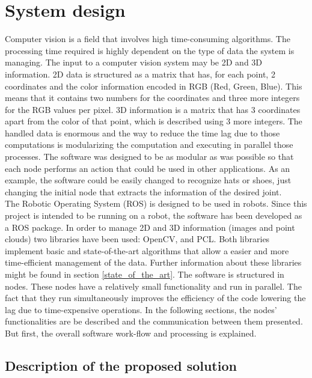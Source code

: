 \newpage
\section{System design}
\label{system_design}
Computer vision is a field that involves high time-consuming algorithms. 
The processing time required is highly dependent on the type of data the system is managing. 
The input to a computer vision system may be 2D and 3D information. 
2D data is structured as a matrix that has, for each point, 2 coordinates and the color information encoded in RGB (Red, Green, Blue).
This means that it contains two numbers for the coordinates and three more integers for the RGB values per pixel. 
3D information is a matrix that has 3 coordinates apart from the color of that point, which is described using 3 more integers. 
The handled data is enormous and the way to reduce the time lag due to those computations is modularizing the computation and executing in parallel those processes. 
The software was designed to be as modular as was possible so that each node performs an action that could be used in other applications. 
As an example, the software could be easily changed to recognize hats or shoes, just changing the initial node that extracts the information of the desired joint. 
\\

The Robotic Operating System (ROS) is designed to be used in robots. 
Since this project is intended to be running on a robot, the software has been developed as a ROS package. 
In order to manage 2D and 3D information (images and point clouds) two libraries have been used: OpenCV, and PCL. 
Both libraries implement basic and state-of-the-art algorithms that allow a easier and more time-efficient management of the data. Further information about these libraries might be found in section \ref{state_of_the_art}. 
The software is structured in nodes. 
These nodes have a relatively small functionality and run in parallel. 
The fact that they run simultaneously improves the efficiency of the code lowering the lag due to time-expensive operations. 
In the following sections, the nodes' functionalities are be described and the communication between them presented. 
But first, the overall software work-flow and processing is explained. 


\subsection{Description of the proposed solution}

